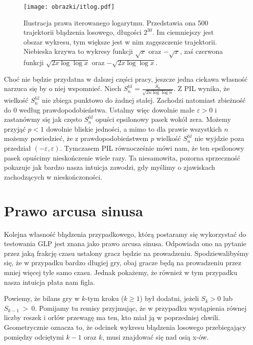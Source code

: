 \documentclass[a4paper,11pt,twoside]{book}
\newcommand{\Slil}[1]{S^{lil}_#1}
\theoremstyle{definition}
\begin{document}
\begin{figure}[!ht]
 \centering
 \texttt{[image: obrazki/itlog.pdf]}
 \caption{Ilustracja prawa iterowanego logarytmu. Przedstawia ona 500 trajektorii błądzenia losowego, długości $2^{30}$. Im ciemniejszy jest obszar wykresu, tym większe jest w nim zagęszczenie trajektorii. Niebieska krzywa to wykresy funkcji $\sqrt{x}$ oraz $-\sqrt{x}$, zaś czerwona funkcji $\sqrt{2 x \log \log x}$ oraz $-\sqrt{2 x \log \log x}$.}
 \label{fig:itlog}
\end{figure}

Choć nie będzie przydatna w dalszej części pracy, jeszcze jedna ciekawa własność narzuca się by o niej wspomnieć. Niech $\Slil{n} = \frac{S_n}{\sqrt{2n \log \log n}}$. Z PIL wynika, że wielkość $\Slil{n}$ nie zbiega punktowo do żadnej stałej. Zachodzi natomiast zbieżność do 0 według prawdopodobieństwa. Ustalmy więc dowolnie małe $\varepsilon > 0$ i zastanówmy się jak często $\Slil{n}$ opuści epsilonowy pasek wokół zera. Możemy przyjąć $p < 1$ dowolnie bliskie jedności, a mimo to dla prawie wszystkich $n$ możemy powiedzieć, że z prawdopodobieństwem $p$ wielkość $\Slil{n}$ nie wyjdzie poza przedział $(-\varepsilon, \varepsilon)$. Tymczasem PIL równocześnie mówi nam, że ten epsilonowy pasek opuścimy nieskończenie wiele razy. Ta niesamowita, pozorna sprzeczność pokazuje jak bardzo nasza intuicja zawodzi, gdy myślimy o zjawiskach zachodzących w nieskończoności.

\section{Prawo arcusa sinusa}
\label{sec:asin}

Kolejna własność błądzenia przypadkowego, którą postaramy się wykorzystać do testowania GLP jest znana jako prawo arcusa sinusa. Odpowiada ono na pytanie przez jaką frakcję czasu ustalony gracz będzie na prowadzeniu. Spodziewalibyśmy się, że w przypadku bardzo długiej gry, obaj gracze będą na prowadzeniu przez mniej więcej tyle samo czasu. Jednak pokażemy, że również w tym przypadku nasza intuicja płata nam figla.

Powiemy, że bilans gry w $k$-tym kroku ($k \geq 1$) był dodatni, jeżeli $S_k > 0$ lub $S_{k-1}~>~0$. Pomijamy tu remisy przyjmując, że w przypadku wystąpienia równej liczby reszek i orłów przewagę ma ten, kto miał ją w poprzedniej chwili. Geometrycznie oznacza to, że odcinek wykresu błądzenia losowego przebiegający pomiędzy odciętymi $k-1$ oraz $k$, musi znajdować się nad osią x-ów.
\end{document}
